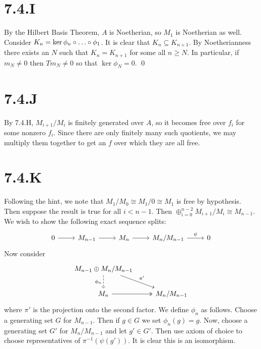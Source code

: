 \documentclass{article}
\begin{document}
\section{7.4.I}
By the Hilbert Basis Theorem, $A$ is Noetherian, so
$M_1$ is Noetherian as well. Consider
$K_n=\ker \phi_n\after \dots \after \phi_1$. It is clear that $K_n \subseteq K_{n+1}$. By
Noetherianness there exists an $N$ such that
$K_n=K_{n+1}$ for some all $n \geq N$. In particular, if
$m_N \neq 0$ then $Tm_N \neq 0$ so that
$\ker \phi_N = 0$. \qed

\section{7.4.J}
By 7.4.H, $M_{i+1}/M_i$ is finitely generated over
$A$, so it becomes free over $f_i$ for
some nonzero $f_i$. Since there are only finitely many such
quotients, we may multiply them together to get an $f$ over
which they are all free.

\section{7.4.K}
Following the hint, we note that $M_1/M_0 \cong M_1/0 \cong M_1$ is free by hypothesis.
Then suppose the result is true for all $i < n-1$. Then
$\oplus_{i=0}^{n-2} M_{i+1}/M_i \cong
    M_{n-1}$. We wish to show the following exact sequence splits:
\[
    \begin{tikzcd}
        0 \ar[r] & M_{n-1} \ar[r] & M_n \ar[r] & M_n/M_{n-1} \ar[r, "\psi"] & 0
    \end{tikzcd}
\]  Now consider \[
    \begin{tikzcd}
        {M_{n-1}\oplus M_n/M_{n-1}} \\{M_n} & {M_n/M_{n-1}}
        \arrow["\pi'",from=1-1, to=2-2]
        \arrow[two heads, from=2-1, to=2-2]
        \arrow["\phi_n"', dashed, from=1-1, to=2-1]
    \end{tikzcd}
\] where
$\pi'$ is the projection onto the second factor. We define
$\phi_n$ as follows. Choose a generating set
$G$ for $M_{n-1}$. Then if
$g \in G$ we set $\phi_n(g)=g$. Now, choose a
generating set $G'$ for $M_n/M_{n-1}$ and let
$g' \in G'$. Then use axiom of choice to choose representatives of
$\pi^{-1}(\psi(g'))$. It is clear this is an isomorphism.
\end{document}
